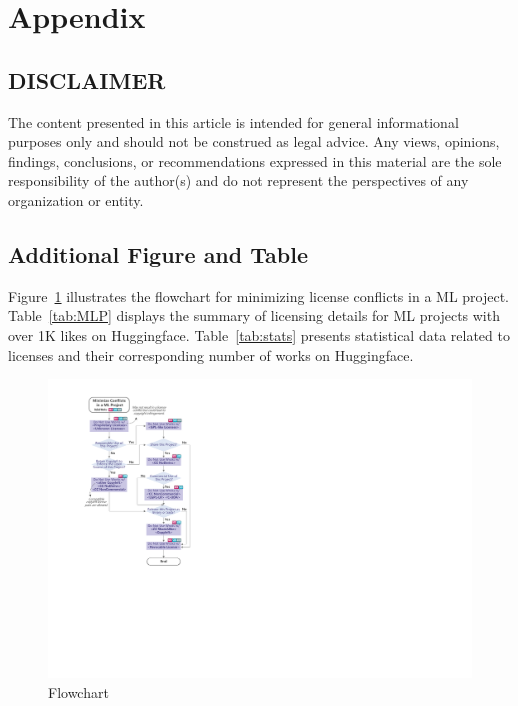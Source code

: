 \section{Appendix}

\subsection{DISCLAIMER}
\label{apdx:disclaimer}
The content presented in this article is intended for general informational purposes only and should not be construed as legal advice. Any views, opinions, findings, conclusions, or recommendations expressed in this material are the sole responsibility of the author(s) and do not represent the perspectives of any organization or entity.

\subsection{Additional Figure and Table}
\label{apdx:A}


Figure~\ref{fig:flowchart} illustrates the flowchart for minimizing license conflicts in a ML project.
Table~\ref{tab:MLP} displays the summary of licensing details for ML projects with over 1K likes on Huggingface.
Table~\ref{tab:stats} presents statistical data related to licenses and their corresponding number of works on Huggingface.

\begin{figure}[b]
  \centering
  \includegraphics[width=\linewidth]{fig/flowchart.pdf}
  \caption{Flowchart}
  \Description{}
  \label{fig:flowchart}
\end{figure}


